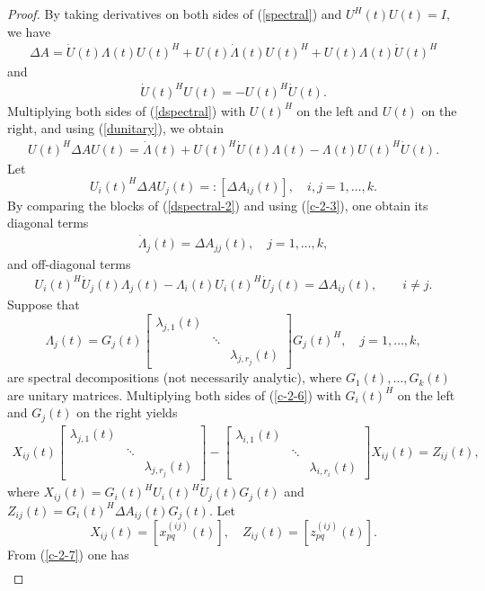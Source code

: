 \documentclass[10pt,a4paper]{amsart}
\newcommand {\mat} [1] {\left[\begin{array}{#1}}
\newcommand {\rix}     {\end{array}\right]}
\begin{document}
\begin{proof}
By taking derivatives on both sides of (\ref{spectral}) and $U^H(t)U(t)=I,$ we have
\begin{eqnarray}\label{dspectral}
\Delta A=\dot{U}(t)\Lambda(t)U(t)^H+U(t)\dot{\Lambda}(t)U(t)^H+U(t)\Lambda(t)\dot{U}(t)^H
\end{eqnarray}
and
\begin{eqnarray}\label{dunitary}
\dot{U}(t)^H U(t)=-U(t)^H \dot{U}(t).
\end{eqnarray}
Multiplying both sides of (\ref{dspectral}) with $U(t)^H$ on the left and $U(t)$ on the right,
and using  (\ref{dunitary}), we obtain
\begin{eqnarray}\label{dspectral-2}
U(t)^H \Delta A U(t) =\dot{\Lambda}(t)+U(t)^H \dot{U}(t)\Lambda(t)-\Lambda(t) U(t)^H \dot{U}(t).
\end{eqnarray}
Let
\[
U_i(t)^H\Delta AU_j(t)=:[\Delta A_{ij}(t)],\quad i,j=1,\ldots,k.
\]
By comparing the blocks of (\ref{dspectral-2}) and using (\ref{c-2-3}), one obtain its diagonal terms
\begin{eqnarray}\label{c-2-5}
\dot\Lambda_j(t)=\Delta A_{jj}(t),\quad j=1,\ldots, k,
\end{eqnarray}
and off-diagonal terms
\begin{eqnarray}\label{c-2-6}
U_i(t)^H\dot U_j(t)\Lambda_j(t)-\Lambda_i(t)U_i(t)^H\dot U_j(t)=\Delta A_{ij}(t),
\qquad i\ne j.
\end{eqnarray}
Suppose that
\[
\Lambda_j(t)=G_j(t)\mat{ccc}\lambda_{j,1}(t)&&\\&\ddots&\\&&\lambda_{j,r_j}(t)\rix
G_j(t)^H,\quad j=1,\ldots,k,
\]
are  spectral decompositions (not necessarily analytic),
where $G_1(t),\ldots,G_k(t)$
are unitary matrices. Multiplying both sides of (\ref{c-2-6}) with $G_i(t)^H$ on the left and  $G_j(t)$ on the right yields
\begin{eqnarray}\label{c-2-7}
X_{ij}(t)\mat{ccc}\lambda_{j,1}(t)&&\\&\ddots&\\&&\lambda_{j,r_j}(t)\rix-
\mat{ccc}\lambda_{i,1}(t)&&\\&\ddots&\\&&\lambda_{i,r_i}(t)\rix X_{ij}(t)
=Z_{ij}(t),
\end{eqnarray}
where $X_{ij}(t)=G_i(t)^HU_i(t)^H\dot U_j(t)G_j(t)$
and $Z_{ij}(t)=G_i(t)^H\Delta A_{ij}(t)G_j(t)$. Let
$$X_{ij}(t)=[x^{(ij)}_{pq}(t)],\quad   Z_{ij}(t)=[z_{pq}^{(ij)}(t)].$$
 From (\ref{c-2-7}) one has
\begin{eqnarray*}

\end{eqnarray*}
\end{proof}
\end{document}

